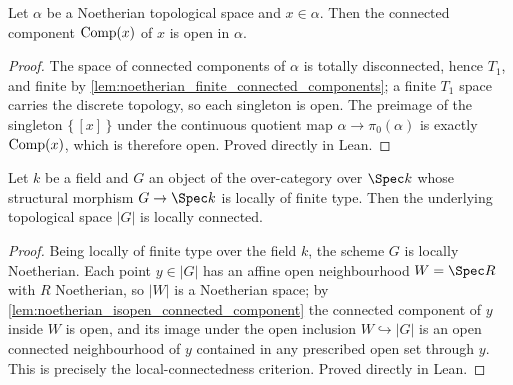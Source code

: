 \begin{lemma}

  \label{lem:noetherian_isopen_connected_component}
  Let \(\alpha\) be a Noetherian topological space and \(x \in \alpha\). Then
  the connected component \(\operatorname{Comp}(x)\) of \(x\) is open in \(\alpha\).
\end{lemma}
\begin{proof}
  The space of connected components of \(\alpha\) is totally disconnected,
  hence \(T_1\), and finite by
  \cref{lem:noetherian_finite_connected_components}; a finite \(T_1\) space
  carries the discrete topology, so each singleton is open. The preimage of
  the singleton \(\{\,[x]\,\}\) under the continuous quotient map
  \(\alpha \to \pi_0(\alpha)\) is exactly \(\operatorname{Comp}(x)\), which is
  therefore open. Proved directly in Lean.
\end{proof}

\begin{lemma}

  \label{lem:identity_component_locally_connected}
  Let \(k\) be a field and \(G\) an object of the over-category over
  \(\Spec k\) whose structural morphism \(G \to \Spec k\) is locally of
  finite type. Then the underlying topological space \(|G|\) is locally
  connected.
\end{lemma}
\begin{proof}
  Being locally of finite type over the field \(k\), the scheme \(G\) is
  locally Noetherian. Each point \(y \in |G|\) has an affine open
  neighbourhood \(W = \Spec R\) with \(R\) Noetherian, so \(|W|\) is a
  Noetherian space; by
  \cref{lem:noetherian_isopen_connected_component} the connected component
  of \(y\) inside \(W\) is open, and its image under the open inclusion
  \(W \hookrightarrow |G|\) is an open connected neighbourhood of \(y\)
  contained in any prescribed open set through \(y\). This is precisely the
  local-connectedness criterion. Proved directly in Lean.
\end{proof}

